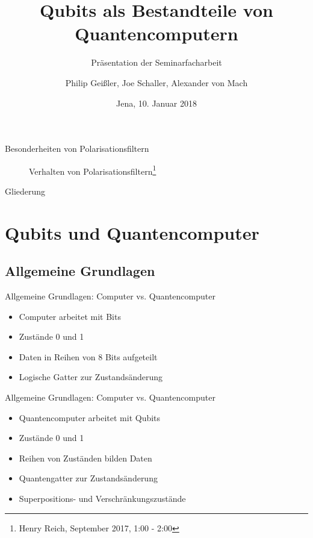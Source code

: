 \documentclass[]{beamer}
\title{Qubits als Bestandteile von Quantencomputern}
\subtitle{Präsentation der Seminarfacharbeit}
\author{Philip Geißler, Joe Schaller, Alexander von Mach}
\date{Jena, 10. Januar 2018}
\begin{document}
\frame{\titlepage}

\begin{frame}{Besonderheiten von Polarisationsfiltern}
	\begin{figure}
	\caption{Verhalten von Polarisationsfiltern\footnote{Henry Reich, September 2017, 1:00 - 2:00}}
	\end{figure}
\end{frame}

\begin{frame}{Gliederung}
\tableofcontents
\end{frame}

\section{Qubits und Quantencomputer}
\subsection{Allgemeine Grundlagen}
\begin{frame}{Allgemeine Grundlagen: Computer vs. Quantencomputer}
\begin{center}
	\begin{itemize}
	\item Computer arbeitet mit Bits
    \item Zustände 0 und 1
    \item Daten in Reihen von 8 Bits aufgeteilt
    \item Logische Gatter zur Zustandsänderung
	\end{itemize}
\end{center}
\end{frame}

\begin{frame}{Allgemeine Grundlagen: Computer vs. Quantencomputer}
\begin{center}
	\begin{itemize}
	\item Quantencomputer arbeitet mit Qubits
    \item Zustände 0 und 1
    \item Reihen von Zuständen bilden Daten
    \item Quantengatter zur Zustandsänderung
    \item Superpositions- und Verschränkungszustände
	\end{itemize}
\end{center}
\end{frame}
\end{document}
